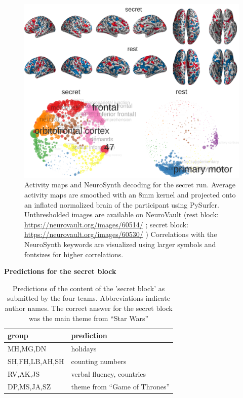 \documentclass[fleqn,10pt]{SelfArx} %
\begin{document}
		
\begin{figure}[htbp]
	\begin{minipage}{\textwidth}
		\renewcommand{\familydefault}{\sfdefault}\normalfont
		\centering
		\includegraphics[width=\columnwidth]{./figs/fig10_secretBrains.png}
		\vspace*{-3mm}
		\caption{Activity maps and NeuroSynth decoding for the secret run. Average activity maps are smoothed with an 8mm kernel and projected onto an inflated normalized brain of the participant using PySurfer. Unthresholded images are available on NeuroVault (rest block: \href{https://neurovault.org/images/60514/}{https://neurovault.org/images/60514/} ; secret block: \href{https://neurovault.org/images/60530/}{https://neurovault.org/images/60530/} ) Correlations with the NeuroSynth keywords are visualized using larger symbols and fontsizes for higher correlations.}%
		\label{fig:secret}
	\end{minipage}
\end{figure}
		

\begin{table}[htbp]
	\scriptsize
	\centering
	\captionsetup{singlelinecheck = false, justification=justified}

	\caption{\bf Predictions for the secret block}
	\begin{tabularx}{\columnwidth}{ll}
		\hline
		{\bf group} &{\bf  prediction} \\
		\hline
		MH,MG,DN    & holidays \\
		SH,FH,LB,AH,SH    & counting numbers \\
		RV,AK,JS    & verbal fluency, countries \\
		DP,MS,JA,SZ    & theme from “Game of Thrones” \\
		\hline
	\end{tabularx}
	\caption*{Predictions of the content of the 'secret block' as submitted by the four teams. Abbreviations indicate author names. The correct answer for the secret block was the main theme from “Star Wars”}
	\label{tab:secretTab}
\end{table}
\end{document}
